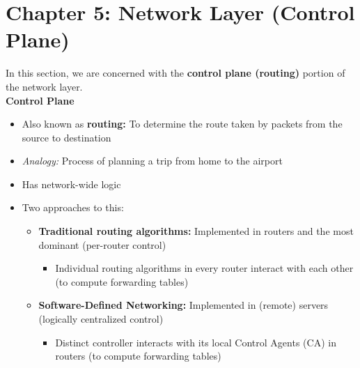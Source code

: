 \documentclass{article}
\begin{document}
\section{Chapter 5: Network Layer (Control Plane)}
In this section, we are concerned with the \textbf{control plane (routing)} portion of the network layer. \\
\textbf{Control Plane}
\begin{itemize}
    \item Also known as \textbf{routing:} To determine the route taken by packets from the source to destination
    \item \textit{Analogy:} Process of planning a trip from home to the airport
    \item Has network-wide logic
    \item Two approaches to this: 
    \begin{itemize}
        \item \textbf{Traditional routing algorithms:} Implemented in routers and the most dominant (per-router control)
        \begin{itemize}
            \item Individual routing algorithms in every router interact with each other (to compute forwarding tables)
        \end{itemize}
        \item \textbf{Software-Defined Networking:} Implemented in (remote) servers (logically centralized control)
        \begin{itemize}
            \item Distinct controller interacts with its local Control Agents (CA) in routers (to compute forwarding tables)
        \end{itemize}
    \end{itemize}
\end{itemize}

\end{document}
